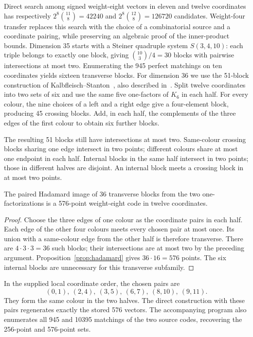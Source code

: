 Direct search among signed weight-eight vectors in eleven and twelve
coordinates has respectively $2^8\binom{11}{8}=42240$ and
$2^8\binom{12}{8}=126720$ candidates. Weight-four transfer replaces this
search with the choice of a combinatorial source and a coordinate pairing,
while preserving an algebraic proof of the inner-product bounds.
Dimension 35 starts with a Steiner quadruple system $S(3,4,10)$:
each triple belongs to exactly one block, giving $\binom{10}{3}/4=30$
blocks with pairwise intersections at most two. Enumerating the 945
perfect matchings on ten coordinates yields sixteen transverse blocks.
For dimension 36 we use the 51-block construction of
Kalbfleisch--Stanton~\cite[Theorem 7]{kalbfleisch-stanton}, also described
in~\cite[Section V, Construction 1]{signed-johnson}.
Split twelve coordinates into two sets of six and
use the same five one-factors of $K_6$ in each half. For every colour,
the nine choices of a left and a right edge give a four-element block,
producing 45 crossing blocks. Add, in each half, the complements of
the three edges of the first colour to obtain six further blocks.

The resulting 51 blocks still have intersections at most two.
Same-colour crossing blocks sharing one edge intersect in two points;
different colours share at most one endpoint in each half. Internal
blocks in the same half intersect in two points; those in different
halves are disjoint. An internal block meets a crossing block in at most
two points.

\begin{proposition}
\label{prop:local36}
The paired Hadamard image of 36 transverse blocks from the two
one-factorizations is a 576-point weight-eight code in twelve coordinates.
\end{proposition}
\begin{proof}
Choose the three edges of one colour as the coordinate pairs in each
half. Each edge of the other four colours meets every chosen pair at most
once. Its union with a same-colour edge from the other half is therefore
transverse. There are $4\cdot3\cdot3=36$ such blocks; their intersections
are at most two by the preceding argument. Proposition~\ref{prop:hadamard}
gives $36\cdot16=576$ points. The six internal blocks are unnecessary
for this transverse subfamily.
\end{proof}

In the supplied local coordinate order, the chosen pairs are
\[
(0,1),\ (2,4),\ (3,5),\ (6,7),\ (8,10),\ (9,11).
\]
They form the same colour in
the two halves. The direct construction with these pairs regenerates
exactly the stored 576 vectors. The accompanying program also enumerates
all 945 and 10395 matchings of the two source codes, recovering the
256-point and 576-point sets.

